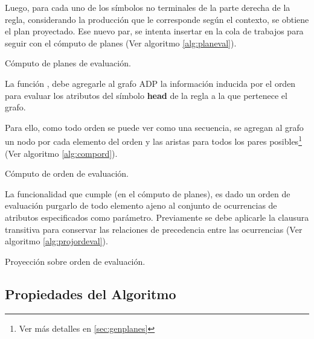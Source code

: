 Luego, para cada uno de los símbolos no terminales de la parte derecha de la regla, considerando la producción que le corresponde según el contexto, se obtiene el plan proyectado. Ese nuevo par, se intenta insertar en la cola de trabajos para seguir con el cómputo de planes (Ver algoritmo \ref{alg:planeval}).

\begin{algorithm}[!ht]

\vspace{-0.5cm}
\caption{\label{alg:planeval}Cómputo de planes de evaluación.}
\end{algorithm}

La función , debe agregarle al grafo ADP la información inducida por el orden para evaluar los atributos del símbolo \textbf{head} de la regla a la que pertenece el grafo.

Para ello, como todo orden se puede ver como una secuencia, se agregan al grafo un nodo por cada elemento del orden y las aristas para todos los pares posibles\footnote{Ver más detalles en \ref{sec:genplanes}} (Ver algoritmo \ref{alg:compord}).

\begin{algorithm}[!ht]

\vspace{-0.5cm}
\caption{\label{alg:compord}Cómputo de orden de evaluación.}
\end{algorithm}

La funcionalidad que cumple  (en el cómputo de planes), es dado un orden de evaluación purgarlo de todo elemento ajeno al conjunto de ocurrencias de atributos especificados como parámetro. Previamente se debe aplicarle la clausura transitiva para conservar las relaciones de precedencia entre las ocurrencias (Ver algoritmo \ref{alg:projordeval}).

\begin{algorithm}[!ht]

\vspace{-0.5cm}
\caption{\label{alg:projordeval}Proyección sobre orden de evaluación.}
\end{algorithm}

\subsection*{Propiedades del Algoritmo}

